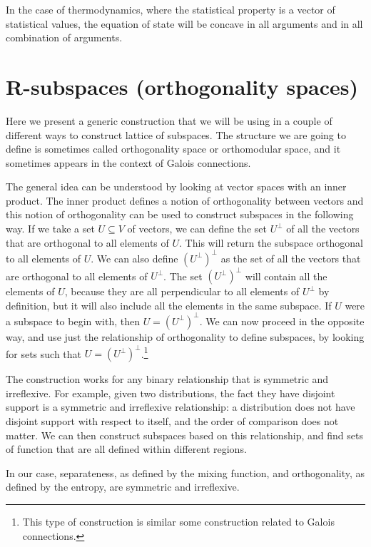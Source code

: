 \begin{remark}
	In the case of thermodynamics, where the statistical property is a vector of statistical values, the equation of state will be concave in all arguments and in all combination of arguments.
\end{remark}


\section{R-subspaces (orthogonality spaces)}\label{pm_es_subspaceSection}

Here we present a generic construction that we will be using in a couple of different ways to construct lattice of subspaces. The structure we are going to define is sometimes called orthogonality space or orthomodular space, and it sometimes appears in the context of Galois connections.

The general idea can be understood by looking at vector spaces with an inner product. The inner product defines a notion of orthogonality between vectors and this notion of orthogonality can be used to construct subspaces in the following way. If we take a set $U \subseteq V$ of vectors, we can define the set $U^{\perp}$ of all the vectors that are orthogonal to all elements of $U$. This will return the subspace orthogonal to all elements of $U$. We can also define $(U^{\perp})^{\perp}$ as the set of all the vectors that are orthogonal to all elements of $U^{\perp}$. The set $(U^{\perp})^{\perp}$ will contain all the elements of $U$, because they are all perpendicular to all elements of $U^{\perp}$ by definition, but it will also include all the elements in the same subspace. If $U$ were a subspace to begin with, then $U = (U^{\perp})^{\perp}$. We can now proceed in the opposite way, and use just the relationship of orthogonality to define subspaces, by looking for sets such that $U = (U^{\perp})^{\perp}$.\footnote{This type of construction is similar some construction related to Galois connections.}

The construction works for any binary relationship that is symmetric and irreflexive. For example, given two distributions, the fact they have disjoint support is a symmetric and irreflexive relationship: a distribution does not have disjoint support with respect to itself, and the order of comparison does not matter. We can then construct subspaces based on this relationship, and find sets of function that are all defined within different regions.

In our case, separateness, as defined by the mixing function, and orthogonality, as defined by the entropy, are symmetric and irreflexive.

